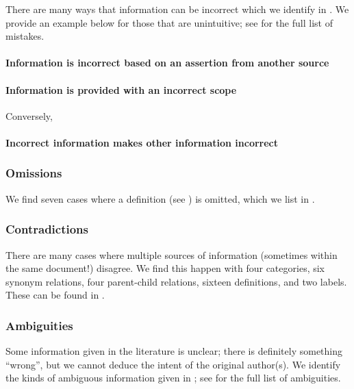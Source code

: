 There are many ways that information can be incorrect which we identify
in . We provide an example below for those that are
unintuitive\ifnotpaper; see  for the full list of mistakes\fi.



\paragraph{Information is incorrect based on an assertion from another source}
\errorGuessFlaw{}

\paragraph{Information is provided with an incorrect scope}
\parSheetTestFlaw{} Conversely, \tolTestFlaw*{}

\paragraph{Incorrect information makes other information incorrect}
\redBoxFlaw{}

\subsubsection{Omissions}\label{miss}
We find seven cases where a definition \ifnotpaper (see ) \fi is
omitted\ifnotpaper, which we list in \fi.

\subsubsection{Contradictions}\label{contra}
There are many cases where multiple sources of information (sometimes within
the same document!) disagree. We find this happen with four categories, six
synonym relations, four parent-child relations, sixteen definitions, and two
labels. \ifnotpaper These can be found in .\fi

\subsubsection{Ambiguities}\label{ambi}
Some information given in the literature is unclear; there is definitely
something ``wrong'', but we cannot deduce the intent of the original author(s).
We identify the kinds of ambiguous information given in %
\ifnotpaper; see  for the full list of ambiguities\fi.

